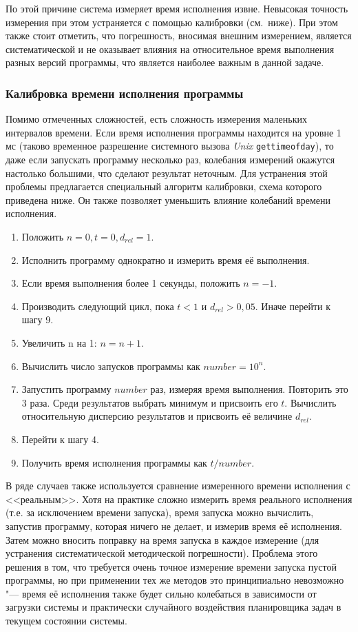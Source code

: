 По этой причине система измеряет время исполнения извне. Невысокая точность измерения при этом устраняется с помощью калибровки (см.~ниже). При этом также стоит отметить, что погрешность, вносимая внешним измерением, является систематической и не оказывает влияния на относительное время выполнения разных версий программы, что является наиболее важным в данной задаче.


\subsubsection{Калибровка времени исполнения программы}
\label{sssect:calibration}
Помимо отмеченных сложностей, есть сложность измерения маленьких интервалов времени. Если время исполнения программы находится на уровне 1 мс (таково временное разрешение системного вызова \textit{Unix} \texttt{gettimeofday}), то даже если запускать программу несколько раз, колебания измерений окажутся настолько большими, что сделают результат неточным. Для устранения этой проблемы предлагается специальный алгоритм калибровки, схема которого приведена ниже. Он также позволяет уменьшить влияние колебаний времени исполнения.

\begin{enumerate}
    \item Положить $n = 0, t = 0, d_{rel} = 1$.
    \item Исполнить программу однократно и измерить время её выполнения.
    \item Если время выполнения более 1 секунды, положить $n = -1$.
    \item Производить следующий цикл, пока $t < 1$ и $d_{rel} > 0,05$. Иначе перейти к шагу 9.
    \item Увеличить n на 1: $n = n + 1$.
    \item Вычислить число запусков программы как $number = 10^{n}$.
    \item Запустить программу $number$ раз, измеряя время выполнения. Повторить это 3 раза. Среди результатов выбрать минимум и присвоить его $t$. Вычислить относительную дисперсию результатов и присвоить её величине $d_{rel}$.
    \item Перейти к шагу 4.
    \item Получить время исполнения программы как $t / number$.
\end{enumerate}

В ряде случаев также используется сравнение измеренного времени исполнения с <<реальным>>. Хотя на практике сложно измерить время реального исполнения (т.е. за исключением времени запуска), время запуска можно вычислить, запустив программу, которая ничего не делает, и измерив время её исполнения. Затем можно вносить поправку на время запуска в каждое измерение (для устранения систематической методической погрешности). Проблема этого решения в том, что требуется очень точное измерение времени запуска пустой программы, но при применении тех же методов это принципиально невозможно "--- время её исполнения также будет сильно колебаться в зависимости от загрузки системы и практически случайного воздействия планировщика задач в текущем состоянии системы.

